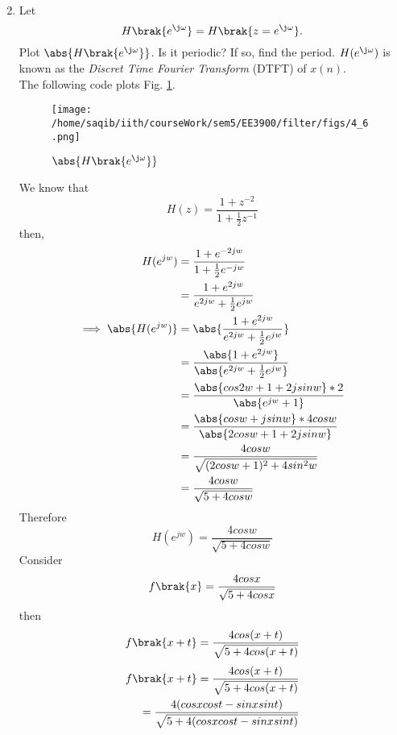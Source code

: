 \documentclass[journal,12pt,twocolumn]{IEEEtran}
\renewcommand\thesection{\arabic{section}}
\begin{document}
\begin{enumerate}[label=\thesection.\arabic*]
\begin{align}
\end{align}
\item 
Let
\begin{equation}
H\brak{e^{\j \omega}} = H\brak{z = e^{\j \omega}}.
\end{equation}
Plot $\abs{H\brak{e^{\j \omega}}}$.  Is it periodic? If so, find the period. $H(e^{\j \omega})$ is
known as the {\em Discret Time Fourier Transform} (DTFT) of $x(n)$.
\\
\solution The following code plots Fig. \ref{fig:dtft}.

\begin{figure}[!ht]
\centering
\texttt{[image: /home/saqib/iith/courseWork/sem5/EE3900/filter/figs/4\_6.png]}
\caption{$\abs{H\brak{e^{\j\omega}}}$}
\label{fig:dtft}
\end{figure}
We know that 
\begin{equation}
	H(z) = \frac{1 + z^{-2}}{1 + \frac{1}{2}z^{-1}}	
\end{equation}
then,
\begin{align}
	H(e^{jw}) &=  \frac{1 + e^{-2jw}}{1 + \frac{1}{2}e^{-jw}}
	\\&= \frac{1 + e^{2jw}}{e^{2jw} + \frac{1}{2}e^{jw}}
	\\ \implies \abs{H(e^{jw})} &= \abs{\frac{1 + e^{2jw}}{e^{2jw} + \frac{1}{2}e^{jw}} }
	\\&= \frac{\abs{1 + e^{2jw}}}{\abs{e^{2jw} + \frac{1}{2}e^{jw}}}
	\\&= \frac{\abs{cos2w+1+2jsinw}*2}{\abs{e^{jw} + 1}}
	\\&= \frac{\abs{cosw+jsinw}*4cosw}{\abs{2cosw+1+2jsinw}}
	\\&= \frac{4cosw}{\sqrt{(2cosw+1)^{2}+4sin^{2}w}}
	\\&= \frac{4cosw}{\sqrt{5+4cosw}}
\end{align}
Therefore 
\begin{equation}
	H(e^{jw}) = \frac{4cosw}{\sqrt{5+4cosw}}
\end{equation}
Consider 
\begin{equation}
	\label{eq:func_period}
	f\brak{x}=\frac{4cosx}{\sqrt{5+4cosx}}
\end{equation}
then
\begin{equation}
	\label{eq:func_period_new}
	f\brak{x+t}=\frac{4cos(x+t)}{\sqrt{5+4cos(x+t)}}
\end{equation}
\begin{align}
	f\brak{x+t}=\frac{4cos(x+t)}{\sqrt{5+4cos(x+t)}}
	\\=\frac{4(cosxcost-sinxsint)}{\sqrt{5+4(cosxcost-sinxsint)}}

\end{align}
\end{enumerate}
\end{document}
